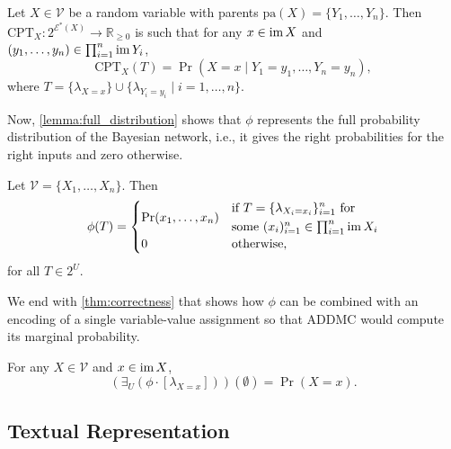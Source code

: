 \begin{lemma} \label{lemma:cpt}
  Let $X \in \mathcal{V}$ be a random variable with parents $\mathrm{pa}(X) = \{ Y_1,
  \dots, Y_n \}$. Then $\mathrm{CPT}_X\colon 2^{\mathcal{E}^*(X)} \to
  \mathbb{R}_{\ge 0}$ is such that for any $x \in \operatorname{im} X$ and $(y_1, \dots, y_n)
  \in \prod_{i=1}^n \operatorname{im} Y_i$,
  \[
    \mathrm{CPT}_X (T) = \Pr(X = x \mid Y_1 = y_1, \dots, Y_n = y_n),
  \]
  where $T = \{ \lambda_{X=x} \} \cup \{ \lambda_{Y_i=y_i} \mid i = 1, \dots, n
  \}$.
\end{lemma}

Now, \cref{lemma:full_distribution} shows that $\phi$ represents the full
probability distribution of the Bayesian network, i.e., it gives the right
probabilities for the right inputs and zero otherwise. 

\begin{lemma} \label{lemma:full_distribution}
  Let $\mathcal{V} = \{X_1, \dots, X_n\}$. Then
  \[
    \phi(T) =
    \begin{cases}
      \Pr(x_1, \dots, x_n) &
      \begin{aligned}
        &\text{if } T = \{ \lambda_{X_i=x_i} \}_{i = 1}^n \text{ for} \\
        &\text{some } \textstyle (x_i)_{i=1}^n \in \prod_{i=1}^n \operatorname{im} X_i
      \end{aligned} \\
      0 & \text{otherwise,}
    \end{cases}
  \]
  for all $T \in 2^U$.
\end{lemma}

We end with \cref{thm:correctness} that shows how $\phi$ can be combined with an
encoding of a single variable-value assignment so that \textsf{ADDMC}
\citep{DBLP:conf/aaai/DudekPV20} would compute its marginal probability.

\begin{theorem} \label{thm:correctness}
  For any $X \in \mathcal{V}$ and $x \in \operatorname{im} X$,
  \[
    (\exists_U(\phi \cdot [\lambda_{X=x}]))(\emptyset) = \Pr(X = x).
  \]
\end{theorem}

\subsection{Textual Representation} \label{sec:textual_representation}

